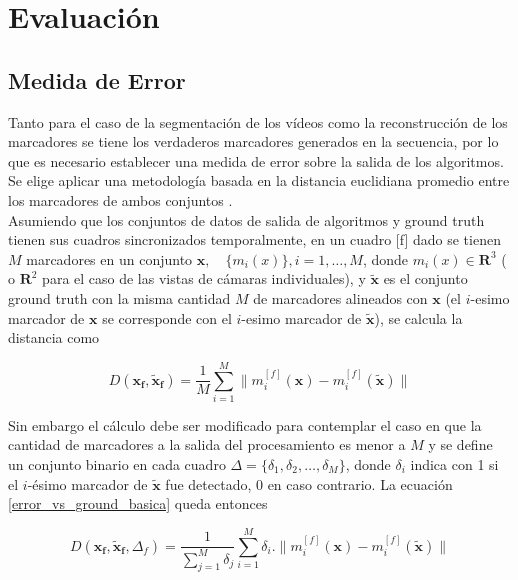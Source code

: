 \chapter{Evaluación}
\label{evaluacion}
\section{Medida de Error}
\label{subsec:medida_error}

Tanto para el caso de la segmentación de los vídeos como la reconstrucción de los marcadores se tiene los verdaderos marcadores generados en la secuencia, por lo que es necesario establecer una medida de error sobre la salida de los algoritmos. Se elige aplicar una metodología basada en la distancia euclidiana promedio entre los marcadores de ambos conjuntos \cite{humaneva} . 
\\ 

Asumiendo que los conjuntos de datos de salida de algoritmos y ground truth tienen sus cuadros sincronizados temporalmente, en un cuadro [f] dado se tienen $M$ marcadores en un conjunto $ \boldsymbol{x},\quad\{m_{i}(x)\},i=1,\ldots,M $, donde $ m_{i}(x)\in{\mathbf{R}^{3}} $ ( o $ \mathbf{R}^{2} $ para el caso de las vistas de cámaras individuales), y $ \boldsymbol{\tilde{x}} $ es el conjunto ground truth con la misma cantidad $M$ de marcadores alineados con $\boldsymbol{x}$ (el $i$-esimo marcador de $\boldsymbol{x}$ se corresponde con el  $i$-esimo marcador de $\boldsymbol{\tilde{x}}$), se calcula la distancia como

\begin{equation} \label{error_vs_ground_basica}
D(\boldsymbol{x_{f}},\boldsymbol{\tilde{x}_{f}})=\frac{1}{M}\sum_{i=1}^{M} \|m_{i}^{[f]}(\boldsymbol{x})-m_{i}^{[f]}(\boldsymbol{\tilde{x}})\|
\end{equation}

Sin embargo el cálculo debe ser modificado para contemplar el caso en que la cantidad de marcadores a la salida del procesamiento es menor a $M$ y se define un conjunto binario en cada cuadro $\Delta=\{\delta_1,\delta_2,\ldots,\delta_M\}$, donde $\delta_i$ indica con 1 si el $i$-ésimo marcador de $\boldsymbol{\tilde{x}}$ fue detectado, $0$ en caso contrario. La ecuación \eqref{error_vs_ground_basica} queda entonces

\begin{equation}\label{error_vs_ground_deteccion}
D(\boldsymbol{x_{f}},\boldsymbol{\tilde{x}_{f}},\Delta_{f})=\frac{1}{\sum_{j=1}^{M} \delta_j} \sum_{i=1}^{M} \delta_i.\|m_{i}^{[f]}(\boldsymbol{x})-m_{i}^{[f]}(\boldsymbol{\tilde{x}})\|
\end{equation}

